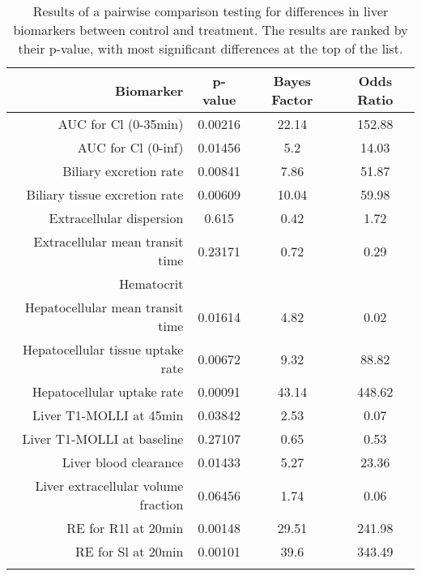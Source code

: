 \documentclass{epflreport}%
\begin{document}
%
\begin{longtable}{rccc}%
\hline%
Biomarker&p{-}value&Bayes Factor&Odds Ratio\\%
\hline%
AUC for Cl (0{-}35min)&0.00216&22.14&152.88\\%
AUC for Cl (0{-}inf)&0.01456&5.2&14.03\\%
Biliary excretion rate&0.00841&7.86&51.87\\%
Biliary tissue excretion rate&0.00609&10.04&59.98\\%
Extracellular dispersion&0.615&0.42&1.72\\%
Extracellular mean transit time&0.23171&0.72&0.29\\%
Hematocrit&&&\\%
Hepatocellular mean transit time&0.01614&4.82&0.02\\%
Hepatocellular tissue uptake rate&0.00672&9.32&88.82\\%
Hepatocellular uptake rate&0.00091&43.14&448.62\\%
Liver T1{-}MOLLI at 45min&0.03842&2.53&0.07\\%
Liver T1{-}MOLLI at baseline&0.27107&0.65&0.53\\%
Liver blood clearance&0.01433&5.27&23.36\\%
Liver extracellular volume fraction&0.06456&1.74&0.06\\%
RE for R1l at 20min&0.00148&29.51&241.98\\%
RE for Sl at 20min&0.00101&39.6&343.49\\%
\hline%
\caption{Results of a pairwise comparison testing for differences in liver biomarkers between control and treatment. The results are ranked by their p-value, with most significant differences at the top of the list.} \\%
\end{longtable}%
\end{document}
